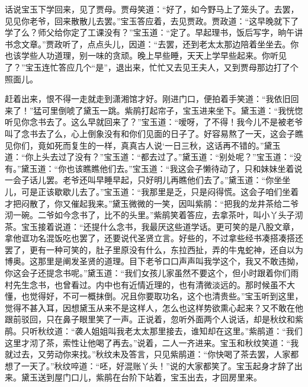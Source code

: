 


\begin{parag}
    话说宝玉下学回来，见了贾母。贾母笑道：“好了，如今野马上了笼头了。去罢，见见你老爷，回来散散儿去罢。”宝玉答应着，去见贾政。贾政道：“这早晚就下了学了么？师父给你定了工课没有？”宝玉道：“定了。早起理书，饭后写字，晌午讲书念文章。”贾政听了，点点头儿，因道：“去罢，还到老太太那边陪着坐坐去。你也该学些人功道理，别一味的贪顽。晚上早些睡，天天上学早些起来。你听见了？”宝玉连忙答应几个“是”，退出来，忙忙又去见王夫人，又到贾母那边打了个照面儿。
\end{parag}


\begin{parag}
    赶着出来，恨不得一走就走到潇湘馆才好。刚进门口，便拍着手笑道：“我依旧回来了！”猛可里倒唬了黛玉一跳。紫鹃打起帘子，宝玉进来坐下。黛玉道：“我恍惚听见你念书去了。这么早就回来了？”宝玉道：“嗳呀，了不得！我今儿不是被老爷叫了念书去了么，心上倒象没有和你们见面的日子了。好容易熬了一天，这会子瞧见你们，竟如死而复生的一样，真真古人说‘一日三秋，这话再不错的。”黛玉道：“你上头去过了没有？”宝玉道：“都去过了。”黛玉道：“别处呢？”宝玉道：“没有。”黛玉道：“你也该瞧瞧他们去。”宝玉道：“我这会子懒待动了，只和妹妹坐着说一会子话儿罢。老爷还叫早睡早起，只好明儿再瞧他们去了。”黛玉道：“你坐坐儿，可是正该歇歇儿去了。”宝玉道：“我那里是乏，只是闷得慌。这会子咱们坐着才把闷散了，你又催起我来。”黛玉微微的一笑，因叫紫鹃：“把我的龙井茶给二爷沏一碗。二爷如今念书了，比不的头里。”紫鹃笑着答应，去拿茶叶，叫小丫头子沏茶。宝玉接着说道：“还提什么念书，我最厌这些道学话。更可笑的是八股文章，拿他诓功名混饭吃也罢了，还要说代圣贤立言。好些的，不过拿些经书凑搭凑搭还罢了，更有一种可笑的，肚子里原没有什么，东拉西扯，弄的牛鬼蛇神，还自以为博奥。这那里是阐发圣贤的道理。目下老爷口口声声叫我学这个，我又不敢违拗，你这会子还提念书呢。”黛玉道：“我们女孩儿家虽然不要这个，但小时跟着你们雨村先生念书，也曾看过。内中也有近情近理的，也有清微淡远的。那时候虽不大懂，也觉得好，不可一概抹倒。况且你要取功名，这个也清贵些。”宝玉听到这里，觉得不甚入耳，因想黛玉从来不是这样人，怎么也这样势欲熏心起来？又不敢在他跟前驳回，只在鼻子眼里笑了一声。正说着，忽听外面两个人说话，却是秋纹和紫鹃。只听秋纹道：“袭人姐姐叫我老太太那里接去，谁知却在这里。”紫鹃道：“我们这里才沏了茶，索性让他喝了再去。”说着，二人一齐进来。宝玉和秋纹笑道：“我就过去，又劳动你来找。”秋纹未及答言，只见紫鹃道：“你快喝了茶去罢，人家都想了一天了。”秋纹啐道：“呸，好混账丫头！”说的大家都笑了。宝玉起身才辞了出来。黛玉送到屋门口儿，紫鹃在台阶下站着，宝玉出去，才回房里来。
\end{parag}


